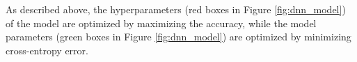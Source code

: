 \documentclass[useamsfonts]{pasj01}
\begin{document}
As described above, the hyperparameters (red boxes in Figure \ref{fig:dnn_model}) of the model are optimized by maximizing the accuracy, while 
the model parameters (green boxes in Figure \ref{fig:dnn_model}) are optimized by minimizing cross-entropy error.

\end{document}
